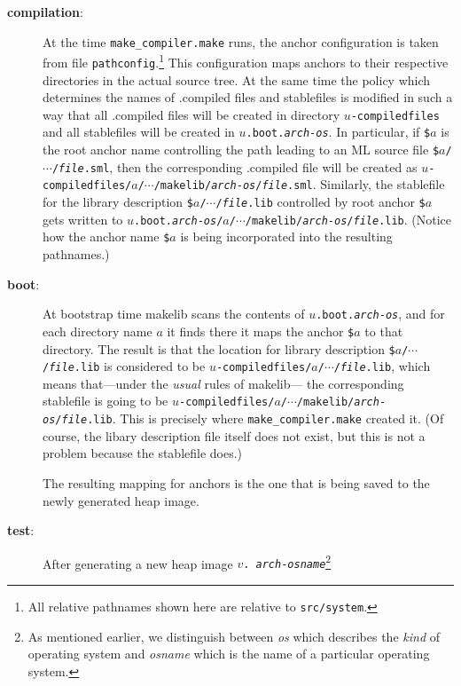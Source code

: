 \begin{description}
\item[{\bf compilation}:]
At the time {\tt make_compiler.make} runs, the anchor configuration is taken
from file {\tt pathconfig}.\footnote{All relative pathnames shown here
are relative to {\tt src/system}.}  This configuration maps anchors to
their respective directories in the actual source tree.  At the same
time the policy which determines the names of .compiled files
and stablefiles is modified in such a way that all .compiled files will be
created in directory {\tt $u$-compiledfiles} and all
stablefiles will be created in {\tt $u$.boot{.\it arch}-{\it os}}.
In particular, if {\tt \$$a$} is the root anchor name controlling
the path leading to an ML source file
{\tt \$$a$/$\cdots$/{\it file}.sml},
then the corresponding .compiled file will be created as
{\tt $u$-compiledfiles/$a$/$\cdots$/makelib/{\it arch}-{\it os}/{\it file}.sml}.
Similarly, the stablefile for the library description
{\tt \$$a$/$\cdots$/{\it file}.lib} controlled by root anchor {\tt \$$a$}
gets written to
{\tt $u$.boot{.\it arch}-{\it os}/$a$/$\cdots$/makelib/{\it arch}-{\it os}/{\it file}.lib}.
(Notice how the anchor name {\tt \$$a$} is being incorporated into the
resulting pathnames.)
\item[{\bf boot}:]
At bootstrap time makelib
scans the contents of {\tt $u$.boot{.\it arch}-{\it os}}, and for
each directory name $a$ it finds there it maps the anchor {\tt \$$a$} to that
directory.  The result is that the location for library description
{\tt \$$a$/$\cdots$/{\it file}.lib}
is considered to be
{\tt $u$-compiledfiles/$a$/$\cdots$/{\it file}.lib}, which
means that---under the {\em usual} rules of makelib---
the corresponding stablefile is going to be
{\tt $u$-compiledfiles/$a$/$\cdots$/makelib/{\it arch}-{\it
os}/{\it file}.lib}.  This is precisely where {\tt make_compiler.make} created
it.  (Of course, the libary description file itself does not exist,
but this is not a problem because the stablefile does.)

The resulting mapping for anchors is the one that is being saved to the
newly generated heap image.
\item[{\bf test}:] After generating a new heap image {\tt $v${.\it
arch}-{\it osname}}\footnote{As mentioned earlier, we distinguish
between {\it os} which describes the {\em kind} of operating system
and {\it osname} which is the name of a particular operating system.

}
\end{description}
